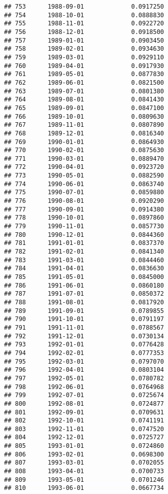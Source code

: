 \documentclass[
]{article}
\begin{document}
\begin{verbatim}
## 753      1988-09-01             0.0917250
## 754      1988-10-01             0.0888830
## 755      1988-11-01             0.0922720
## 756      1988-12-01             0.0918500
## 757      1989-01-01             0.0903450
## 758      1989-02-01             0.0934630
## 759      1989-03-01             0.0929110
## 760      1989-04-01             0.0917930
## 761      1989-05-01             0.0877830
## 762      1989-06-01             0.0821500
## 763      1989-07-01             0.0801380
## 764      1989-08-01             0.0841430
## 765      1989-09-01             0.0847100
## 766      1989-10-01             0.0809630
## 767      1989-11-01             0.0807890
## 768      1989-12-01             0.0816340
## 769      1990-01-01             0.0864930
## 770      1990-02-01             0.0875630
## 771      1990-03-01             0.0889470
## 772      1990-04-01             0.0923720
## 773      1990-05-01             0.0882590
## 774      1990-06-01             0.0863740
## 775      1990-07-01             0.0859880
## 776      1990-08-01             0.0920290
## 777      1990-09-01             0.0914380
## 778      1990-10-01             0.0897860
## 779      1990-11-01             0.0857730
## 780      1990-12-01             0.0844360
## 781      1991-01-01             0.0837370
## 782      1991-02-01             0.0841340
## 783      1991-03-01             0.0844460
## 784      1991-04-01             0.0836630
## 785      1991-05-01             0.0845000
## 786      1991-06-01             0.0860180
## 787      1991-07-01             0.0850372
## 788      1991-08-01             0.0817920
## 789      1991-09-01             0.0789855
## 790      1991-10-01             0.0791197
## 791      1991-11-01             0.0788567
## 792      1991-12-01             0.0730134
## 793      1992-01-01             0.0776428
## 794      1992-02-01             0.0777353
## 795      1992-03-01             0.0797070
## 796      1992-04-01             0.0803104
## 797      1992-05-01             0.0780782
## 798      1992-06-01             0.0764968
## 799      1992-07-01             0.0725674
## 800      1992-08-01             0.0724877
## 801      1992-09-01             0.0709631
## 802      1992-10-01             0.0741191
## 803      1992-11-01             0.0747520
## 804      1992-12-01             0.0725727
## 805      1993-01-01             0.0724860
## 806      1993-02-01             0.0698300
## 807      1993-03-01             0.0702055
## 808      1993-04-01             0.0700733
## 809      1993-05-01             0.0701246
## 810      1993-06-01             0.0667734

\end{verbatim}
\end{document}
